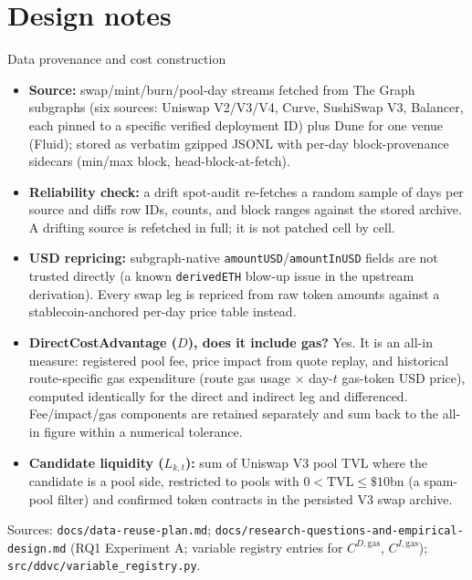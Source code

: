 \documentclass[aspectratio=169]{beamer}
\begin{document}
\section{Design notes}

\begin{frame}{Data provenance and cost construction}
  \scriptsize
  \begin{itemize}
    \item \textbf{Source:} swap/mint/burn/pool-day streams fetched from The Graph subgraphs (six sources: Uniswap V2/V3/V4, Curve, SushiSwap V3, Balancer, each pinned to a specific verified deployment ID) plus Dune for one venue (Fluid); stored as verbatim gzipped JSONL with per-day block-provenance sidecars (min/max block, head-block-at-fetch).
    \item \textbf{Reliability check:} a drift spot-audit re-fetches a random sample of days per source and diffs row IDs, counts, and block ranges against the stored archive. A drifting source is refetched in full; it is not patched cell by cell.
    \item \textbf{USD repricing:} subgraph-native \texttt{amountUSD}/\texttt{amountInUSD} fields are not trusted directly (a known \texttt{derivedETH} blow-up issue in the upstream derivation). Every swap leg is repriced from raw token amounts against a stablecoin-anchored per-day price table instead.
    \item \textbf{DirectCostAdvantage ($D$), does it include gas?} Yes. It is an all-in measure: registered pool fee, price impact from quote replay, and historical route-specific gas expenditure (route gas usage $\times$ day-$t$ gas-token USD price), computed identically for the direct and indirect leg and differenced. Fee/impact/gas components are retained separately and sum back to the all-in figure within a numerical tolerance.
    \item \textbf{Candidate liquidity ($L_{k,t}$):} sum of Uniswap V3 pool TVL where the candidate is a pool side, restricted to pools with $0<\mathrm{TVL}\le\$10$bn (a spam-pool filter) and confirmed token contracts in the persisted V3 swap archive.
  \end{itemize}
  {\scriptsize Sources: \texttt{docs/data-reuse-plan.md}; \texttt{docs/research-questions-and-empirical-design.md} (RQ1 Experiment A; variable registry entries for $C^{D,\mathrm{gas}}$, $C^{I,\mathrm{gas}}$); \texttt{src/ddvc/variable\_registry.py}.}
\end{frame}
\end{document}
